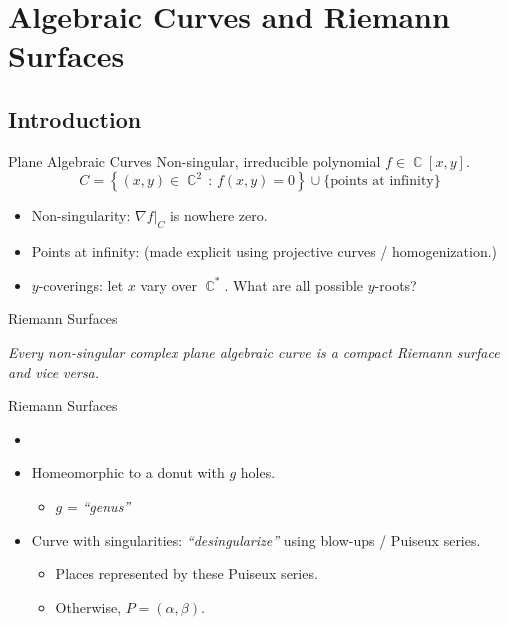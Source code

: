 \documentclass{beamer}
\DeclareMathOperator{\CC}{\mathbb{C}}
\begin{document}
\section{Algebraic Curves and Riemann Surfaces}

\subsection{Introduction}



\begin{frame}{Plane Algebraic Curves}{}
  Non-singular, irreducible polynomial $f \in \CC[x,y]$.
  \[
      C = \left\{ (x,y) \in \CC^2 \, : \, f(x,y) = 0 \right\}
      \cup
      \{\text{points at infinity}\}
  \]
  \begin{itemize}
    \item Non-singularity: $\nabla f \big|_C$ is nowhere zero.
    \item Points at infinity: (made explicit using projective curves /
      homogenization.)
    \item $y$-coverings: let $x$ vary over $\CC^*$. What are all
      possible $y$-roots?
  \end{itemize}
\end{frame}



\begin{frame}{Riemann Surfaces}{}
  \begin{center}
    {\it Every non-singular complex plane algebraic curve is a compact
      Riemann surface and vice versa.}
  \end{center}
  Riemann Surfaces
  \begin{itemize}
    \item{}
    \item<3-> Homeomorphic to a donut with $g$ holes.
      \begin{itemize}
        \item $g$ = {\it ``genus''}
      \end{itemize}
    \item<3-> Curve with singularities: {\it ``desingularize''} using
      blow-ups / Puiseux series.
      \begin{itemize}
        \item Places represented by these Puiseux series.
        \item Otherwise, $P = (\alpha, \beta)$.
      \end{itemize}
  \end{itemize}
\end{frame}
\end{document}
